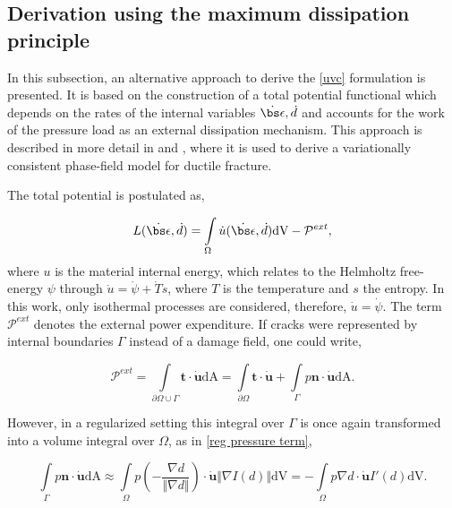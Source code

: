 \subsection{Derivation using the maximum dissipation principle}\label{dyn_derivation}

In this subsection, an alternative approach to derive the \eqref{uvc} formulation  is presented. It is based on the construction of a total potential functional which depends on the rates of the internal variables $\dot{\bs\epsilon},\dot{d}$ and accounts for  the work of the pressure load as an external dissipation mechanism. This approach is described in more detail in \cite{hu2021variationalpaper} and \cite{hu2021variationalthesis}, where it is used to derive a variationally consistent phase-field model for ductile fracture. 

The total potential is postulated as,

\begin{equation}\label{total potential}
    L(\dot{\bs\epsilon},\dot{d}) = \int\limits_{\Omega} \dot{u}(\dot{\bs\epsilon},\dot{d}) \text{dV} - \mathcal{P}^{ext}, 
\end{equation}
where $u$ is the material internal energy, which relates to the Helmholtz free-energy $\psi$ through $\dot{u} = \dot{\psi} + \dot{T}s$, where $T$ is the temperature and $s$ the entropy. 
In this work, only isothermal processes are considered, therefore, $\dot{u} = \dot{\psi}$. The term $\mathcal{P}^{ext}$ denotes the external power expenditure. If cracks were represented by internal boundaries $\Gamma$ instead of a damage field, one could write,

\begin{equation}\label{power expenditure}
    \mathcal{P}^{ext} = \int\limits_{\partial \Omega \cup \Gamma} \textbf{t}\cdot\dot{\textbf{u}} \text{dA} = \int\limits_{\partial \Omega} \textbf{t}\cdot\dot{\textbf{u}} + \int\limits_{\Gamma} p\textbf{n}\cdot\dot{\textbf{u}} \text{dA}.
\end{equation}

\noindent However, in a regularized setting this integral over $\Gamma$ is once again transformed into a volume integral over $\Omega$, as in \eqref{reg pressure term}, 

\begin{equation}\label{reg power expenditure}
    \int\limits_{\Gamma} p\textbf{n}\cdot\dot{\textbf{u}} \text{dA} \approx \int\limits_{\Omega} p \left( -\frac{\nabla d}{\Vert\nabla d\Vert} \right)\cdot\dot{\textbf{u}} \Vert\nabla I(d)\Vert\text{dV} = 
    -\int\limits_{\Omega}p\nabla d \cdot\dot{\textbf{u}} I'(d) \text{dV}.
\end{equation}

